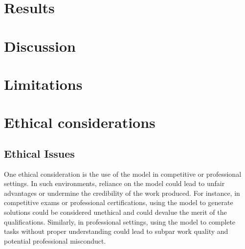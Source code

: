 \documentclass{article}
\begin{document}
\section{Results}


\section{Discussion}


\section{Limitations}

\section{Ethical considerations}



\subsection{Ethical Issues}
One ethical consideration is the use of the model in competitive or professional settings. In such environments, reliance on the model could lead to unfair advantages or undermine the credibility of the work produced. For instance, in competitive exams or professional certifications, using the model to generate solutions could be considered unethical and could devalue the merit of the qualifications. Similarly, in professional settings, using the model to complete tasks without proper understanding could lead to subpar work quality and potential professional misconduct.
\end{document}
